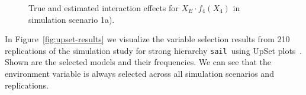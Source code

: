 \documentclass[a4paper,fleqn]{cas-sc}
\newcommand{\sail}{\texttt{sail}}
\begin{document}
\begin{figure}[h]
	\centering
	\quad
	\caption{True and estimated interaction effects for $X_E \cdot f_4(X_4)$ in simulation scenario 1a).}
	\label{fig:X4}
\end{figure}

In Figure~\ref{fig:upset-results} we visualize the variable selection results from 210 replications of the simulation study for strong hierarchy \sail ~using UpSet plots~\citep{upsetR}. Shown are the selected models and their frequencies. We can see that the environment variable is always selected across all simulation scenarios and replications. 
\end{document}
